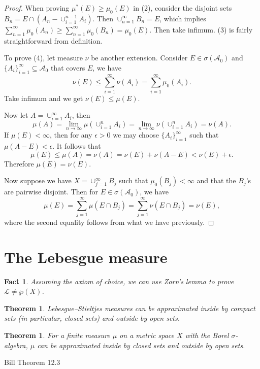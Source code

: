 \documentclass[10pt]{book}
\numberwithin{equation}{chapter}
\theoremstyle{plain-star}
\newtheorem{thm}[equation]{Theorem}
\newtheorem{fact}[equation]{Fact}
\theoremstyle{definition-star}
\theoremstyle{remark-star}
\theoremstyle{plain-star}
\newcommand{\A}{\mathcal{A}}
\begin{document}
\begin{proof}
When proving $\mu^{*}(E)\geq\mu_{0}(E)$ in (2), consider the disjoint
sets $B_{n}=E\cap(A_{n}-\cup_{i=1}^{n-1}A_{i})$. Then $\cup_{n=1}^{\infty}B_{n}=E$,
which implies $\sum_{n=1}^{\infty}\mu_{0}(A_{n})\geq\sum_{n=1}^{\infty}\mu_{0}(B_{n})=\mu_{0}(E)$.
Then take infimum. (3) is fairly straightforward from definition.

To prove (4), let measure $\nu$ be another extension. Consider $E\in\sigma(\A_{0})$
and $\{A_{i}\}_{i=1}^{\infty}\subseteq\A_{0}$ that covers $E$, we
have 
\[
\nu(E)\leq\sum_{i=1}^{\infty}\nu(A_{i})=\sum_{i=1}^{\infty}\mu_{0}(A_{i}).
\]
Take infimum and we get $\nu(E)\leq\mu(E)$.

Now let $A=\cup_{i=1}^{\infty}A_{i}$, then 
\[
\mu(A)=\lim_{n\to\infty}\mu(\cup_{i=1}^{n}A_{i})=\lim_{n\to\infty}\nu(\cup_{i=1}^{n}A_{i})=\nu(A).
\]
If $\mu(E)<\infty$, then for any $\epsilon>0$ we may choose $\{A_{i}\}_{i=1}^{\infty}$
such that $\mu(A-E)<\epsilon$. It follows that 
\[
\mu(E)\leq\mu(A)=\nu(A)=\nu(E)+\nu(A-E)<\nu(E)+\epsilon.
\]
 Therefore $\mu(E)=\nu(E)$.

Now suppose we have $X=\cup_{j=1}^{\infty}B_{j}$ such that $\mu_{0}(B_{j})<\infty$
and that the $B_{j}$'s are pairwise disjoint. Then for $E\in\sigma(\A_{0})$,
we have 
\[
\mu(E)=\sum_{j=1}^{\infty}\mu(E\cap B_{j})=\sum_{j=1}^{\infty}\nu(E\cap B_{j})=\nu(E),
\]
where the second equality follows from what we have previously.
\end{proof}

\section{The Lebesgue measure}
\begin{fact}
    Assuming the axiom of choice, we can use Zorn's lemma to prove $\mathcal{L} \neq \wp(X)$.
\end{fact}

\begin{thm}
    Lebesgue--Stieltjes measures can be approximated inside by compact sets (in particular, closed sets) and outside by open sets.
\end{thm}

\begin{thm}
    For a finite measure $\mu$ on a metric space $X$ with the Borel $\sigma$-algebra, $\mu$ can be approximated inside by closed sets and outside by open sets.
\end{thm}

Bill Theorem 12.3
\end{document}
